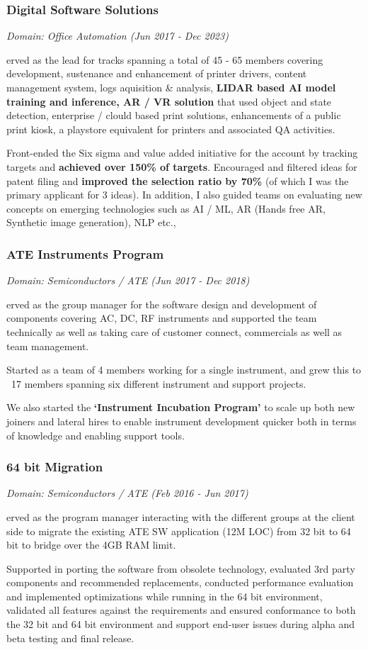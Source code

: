 \documentclass[a4paper,11pt]{article}
\newcommand\cvprojectentry[5]{
  \subsubsection*{#1}
  
  \vspace{-7pt}
  
  \it{Domain: #2}\normalfont{} \quad (#3 - #4)
  
}
\begin{document}
\cvprojectentry{Digital Software Solutions}{Office Automation}{Jun 2017}{Dec 2023}

Served as the lead for tracks spanning a total of 45 - 65 members
covering development, sustenance and enhancement of printer drivers,
content management system, logs aquisition \& analysis, \textbf{LIDAR
  based AI model training and inference, AR / VR solution} that used
object and state detection, enterprise / clould based print solutions,
enhancements of a public print kiosk, a playstore equivalent for
printers and associated QA activities.

Front-ended the Six sigma and value added initiative for the account
by tracking targets and \textbf{achieved over 150\% of
  targets}. Encouraged and filtered ideas for patent filing and
\textbf{improved the selection ratio by 70\%} (of which I was the
primary applicant for 3 ideas). In addition, I also guided teams on
evaluating new concepts on emerging technologies such as AI / ML, AR
(Hands free AR, Synthetic image generation), NLP etc.,

\cvprojectentry{ATE Instruments Program}{Semiconductors / ATE}{Jun 2017}{Dec 2018}

Served as the group manager for the software design and development of
components covering AC, DC, RF instruments and supported the team
technically as well as taking care of customer connect, commercials as
well as team management.
  
Started as a team of 4 members working for a single instrument, and
grew this to ~17 members spanning six different instrument and support
projects.

We also started the \textbf{`Instrument Incubation Program'} to scale
up both new joiners and lateral hires to enable instrument development
quicker both in terms of knowledge and enabling support tools.


\cvprojectentry{64 bit Migration}{Semiconductors / ATE}{Feb 2016}{Jun 2017}

Served as the program manager interacting with the different groups at
the client side to migrate the existing ATE SW application (12M LOC)
from 32 bit to 64 bit to bridge over the 4GB RAM limit.

Supported in porting the software from obsolete technology, evaluated
3rd party components and recommended replacements, conducted
performance evaluation and implemented optimizations while running in
the 64 bit environment, validated all features against the
requirements and ensured conformance to both the 32 bit and 64 bit
environment and support end-user issues during alpha and beta testing
and final release.
 
\end{document}
